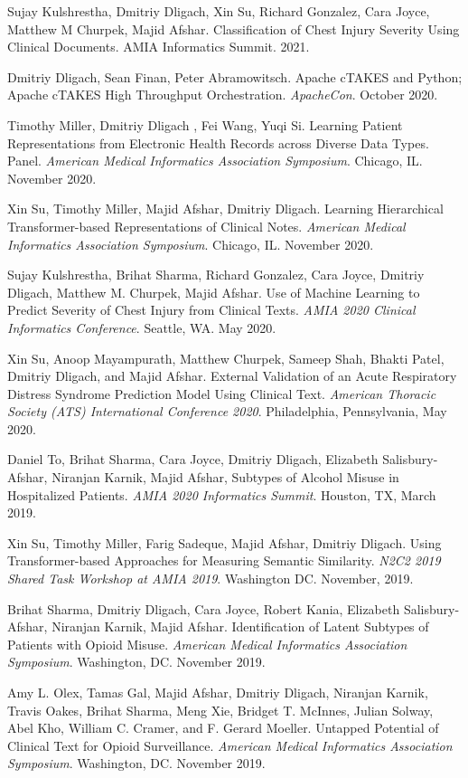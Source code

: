 \documentclass[letterpaper]{article}
\renewenvironment{itemize}{
  \begin{list}{}{
    \setlength{\leftmargin}{1.5em}
  }
}{
  \end{list}
}
\begin{document}
\begin{itemize}
\item Sujay Kulshrestha, Dmitriy Dligach, Xin Su, Richard Gonzalez, Cara Joyce, Matthew M Churpek, Majid Afshar. Classification of Chest Injury Severity Using Clinical Documents. AMIA Informatics Summit. 2021.
\item Dmitriy Dligach, Sean Finan, Peter Abramowitsch. Apache cTAKES and Python; Apache cTAKES High Throughput Orchestration. \emph{ApacheCon}. October 2020.
\item Timothy Miller, Dmitriy Dligach , Fei Wang, Yuqi Si. Learning Patient Representations from Electronic Health Records across Diverse Data Types. Panel. \emph{American Medical Informatics Association Symposium}. Chicago, IL. November 2020.
\item Xin Su, Timothy Miller, Majid Afshar, Dmitriy Dligach. Learning Hierarchical Transformer-based Representations of Clinical Notes. \emph{American Medical Informatics Association Symposium}. Chicago, IL. November 2020.
\item Sujay Kulshrestha, Brihat Sharma, Richard Gonzalez, Cara Joyce, Dmitriy Dligach, Matthew M. Churpek, Majid Afshar. Use of Machine Learning to Predict Severity of Chest Injury from Clinical Texts. \emph{AMIA 2020 Clinical Informatics Conference}. Seattle, WA. May 2020.
\item Xin Su, Anoop Mayampurath, Matthew Churpek, Sameep Shah, Bhakti Patel, Dmitriy Dligach, and Majid Afshar. External Validation of an Acute Respiratory Distress Syndrome Prediction Model Using Clinical Text. \emph{American Thoracic Society (ATS) International Conference 2020}. Philadelphia, Pennsylvania, May 2020.
\item Daniel To, Brihat Sharma, Cara Joyce, Dmitriy Dligach, Elizabeth Salisbury-Afshar, Niranjan Karnik, Majid Afshar, Subtypes of Alcohol Misuse in Hospitalized Patients. \emph{AMIA 2020 Informatics Summit}. Houston, TX, March 2019.
\item Xin Su, Timothy Miller, Farig Sadeque, Majid Afshar, Dmitriy Dligach. Using Transformer-based Approaches for Measuring Semantic Similarity. \emph{N2C2 2019 Shared Task Workshop at AMIA 2019}. Washington DC. November, 2019.
\item Brihat Sharma, Dmitriy Dligach, Cara Joyce, Robert Kania, Elizabeth Salisbury-Afshar, Niranjan Karnik, Majid Afshar. Identification of Latent Subtypes of Patients with Opioid Misuse. \emph{American Medical Informatics Association Symposium}. Washington, DC. November 2019.
\item Amy L. Olex, Tamas Gal, Majid Afshar, Dmitriy Dligach, Niranjan Karnik, Travis Oakes, Brihat Sharma, Meng Xie, Bridget T. McInnes, Julian Solway, Abel Kho, William C. Cramer, and F. Gerard Moeller. Untapped Potential of Clinical Text for Opioid Surveillance. \emph{American Medical Informatics Association Symposium}. Washington, DC. November 2019.

\end{itemize}
\end{document}

